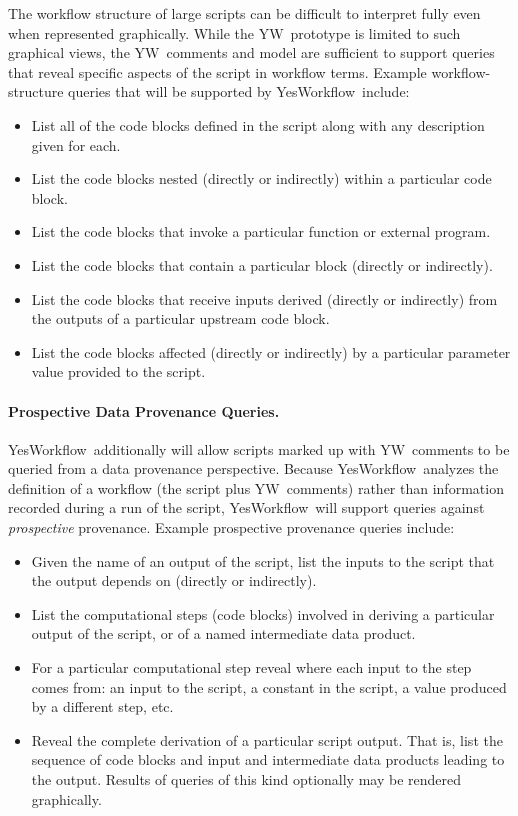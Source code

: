\documentclass[15]{idcc}
\newcommand{\YW}{\textsf{YesWorkflow}}
\newcommand{\yw}{\textsf{YW}}
\begin{document}
The workflow structure of large scripts can be difficult to interpret
fully even when represented graphically.  While the \yw\
prototype is limited to such graphical views, the \yw\ comments and
model are sufficient to support queries that reveal specific aspects
of the script in workflow terms.  Example
workflow-structure queries that will be supported by \YW\ include:
%
\begin{itemize}
\item List all of the code blocks defined in the script along with any description given for each.
\item List the code blocks nested (directly or indirectly) within a particular code block.
\item List the code blocks that invoke a particular function or external program.
\item List the code blocks that contain a particular block (directly or indirectly).
\item List the code blocks that receive inputs derived (directly or indirectly) from the outputs of a particular upstream code block.
\item List the code blocks affected (directly or indirectly) by a particular parameter value provided to the script.
\end{itemize}

\paragraph{Prospective Data Provenance Queries.}
\YW\ additionally will allow scripts
marked up with \yw\ comments to be queried from a data provenance
perspective. Because \YW\ analyzes the definition of a workflow (the
script plus \yw\ comments) rather than information recorded during a
run of the script,  \YW\ will support queries
against \emph{prospective} provenance.
%
Example prospective provenance queries include:
\begin{itemize}
\item Given the name of an output of the script, list the inputs to
  the script that the output depends on (directly or indirectly). 
\item List the computational steps (code blocks) involved in deriving
  a particular output of the script, or of a named intermediate data
  product. 
\item For a particular computational step reveal where each input to
  the step comes from: an input to the script, a constant in the
  script, a value produced by a different step, etc. 
\item Reveal the complete derivation of a particular script output.
  That is, list the sequence of code blocks and input and intermediate
  data products leading to the output. Results of queries of this kind
  optionally may be rendered graphically. 
\end{itemize}
\end{document}
